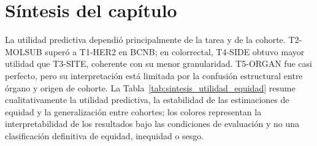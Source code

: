 \section{Síntesis del capítulo}
\label{sec:sintesis_cap6}

La utilidad predictiva dependió principalmente de la tarea y de la cohorte. T2-MOLSUB superó a T1-HER2 en BCNB; en colorrectal, T4-SIDE obtuvo mayor utilidad que T3-SITE, coherente con su menor granularidad. T5-ORGAN fue casi perfecto, pero su interpretación está limitada por la confusión estructural entre órgano y origen de cohorte. La Tabla~\ref{tab:sintesis_utilidad_equidad} resume cualitativamente la utilidad predictiva, la estabilidad de las estimaciones de equidad y la generalización entre cohortes; los colores representan la interpretabilidad de los resultados bajo las condiciones de evaluación y no una clasificación definitiva de equidad, inequidad o sesgo.

